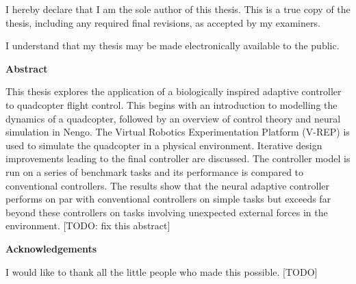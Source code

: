 \cleardoublepage %
 


  \noindent
I hereby declare that I am the sole author of this thesis. This is a true copy of the thesis, including any required final revisions, as accepted by my examiners.

  \bigskip
  
  \noindent
I understand that my thesis may be made electronically available to the public.

\cleardoublepage


\begin{center}\textbf{Abstract}\end{center}

This thesis explores the application of a biologically inspired adaptive controller to quadcopter flight control.
This begins with an introduction to modelling the dynamics of a quadcopter, followed by an overview of control theory and neural simulation in Nengo.
The Virtual Robotics Experimentation Platform (V-REP) is used to simulate the quadcopter in a physical environment.
Iterative design improvements leading to the final controller are discussed.
The controller model is run on a series of benchmark tasks and its performance is compared to conventional controllers. 
The results show that the neural adaptive controller performs on par with conventional controllers on simple tasks but exceeds far beyond these controllers on tasks involving unexpected external forces in the environment.
[TODO: fix this abstract]

\cleardoublepage


\begin{center}\textbf{Acknowledgements}\end{center}

I would like to thank all the little people who made this possible. [TODO]
\cleardoublepage

